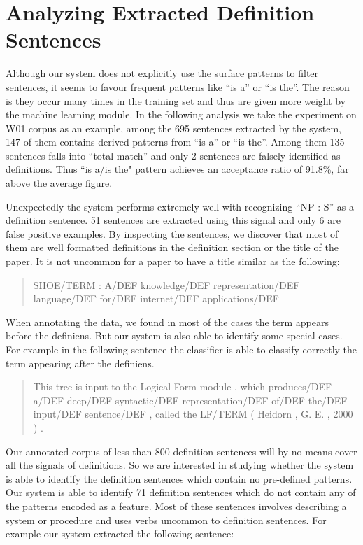 \documentclass[hyp]{socreport}
\begin{document}
\section{Analyzing Extracted Definition Sentences}

Although our system does not explicitly use the surface patterns to filter sentences, it seems to favour frequent patterns like ``is a'' or ``is the''. The reason is they occur many times in the training set and thus are given more weight by the machine learning module. In the following analysis we take the experiment on W01 corpus as an example, among the 695 sentences extracted by the system, 147 of them contains derived patterns from ``is a'' or ``is the''. Among them 135 sentences falls into ``total match'' and only 2 sentences are falsely identified as definitions. Thus ``is a/is the" pattern achieves an acceptance ratio of 91.8\%, far above the average figure. 

Unexpectedly the system performs extremely well with recognizing ``NP : S'' as a definition sentence. 51 sentences are extracted using this signal and only 6 are false positive examples. By inspecting the sentences, we discover that most of them are well formatted definitions in the definition section or the title of the paper. It is not uncommon for a paper to have a title similar as the following:

\begin{quotation}
\noindent
SHOE/TERM : A/DEF knowledge/DEF representation/DEF language/DEF for/DEF internet/DEF applications/DEF 
\end{quotation}  
\noindent
When annotating the data, we found in most of the cases the term appears before the definiens. But our system is also able to identify some special cases. For example in the following sentence the classifier is able to classify correctly the term appearing after the definiens.  

\begin{quotation}
\noindent
This tree is input to the Logical Form module , which produces/DEF a/DEF deep/DEF syntactic/DEF representation/DEF of/DEF the/DEF input/DEF sentence/DEF , called the LF/TERM ( Heidorn , G. E. , 2000 ) . 
\end{quotation}    
\noindent
Our annotated corpus of less than 800 definition sentences will by no means cover all the signals of definitions. So we are interested in studying whether the system is able to identify the definition sentences which contain no pre-defined patterns. Our system is able to identify 71 definition sentences which do not contain any of the patterns encoded as a feature. Most of these sentences involves describing a system or procedure and uses verbs uncommon to definition sentences. For example our system extracted the following sentence:
\end{document}
